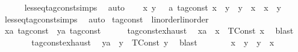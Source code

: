 \begin{isabellebody}
\ \ \ \ \isamarkupfalse%
\ less{\isacharunderscore}eq{\isacharunderscore}tag{\isacharunderscore}const{\isachardot}simps\ \isamarkupfalse%
\ auto\isanewline
{}\isamarkupfalse%
\isanewline
\ \ \isamarkupfalse%
\ {\isacartoucheopen}{\isasymAnd}x\ y\ \ {\isacharcolon}{\isacharcolon}\ {\isacharprime}a\ tag{\isacharunderscore}const{\isachardot}\ x\ {\isasymle}\ y\ {\isasymLongrightarrow}\ y\ {\isasymle}\ x\ {\isasymLongrightarrow}\ x\ {\isacharequal}\ y{\isacartoucheclose}\isanewline
\ \ \ \ \isamarkupfalse%
\ less{\isacharunderscore}eq{\isacharunderscore}tag{\isacharunderscore}const{\isachardot}simps\ \isamarkupfalse%
\ auto\isanewline
{}\isamarkupfalse%
%
\endisatagproof
{\isafoldproof}%
%
\isadelimproof
%
\endisadelimproof
\isanewline
\isanewline
{}\isamarkupfalse%
\isanewline
\isanewline
{}\isamarkupfalse%
\ tag{\isacharunderscore}const\ {\isacharcolon}{\isacharcolon}\ {\isacharparenleft}linorder{\isacharparenright}linorder\isanewline
{}\isanewline
{}\isamarkupfalse%
%
\isadelimproof
\ %
\endisadelimproof
%
\isatagproof
{}\isamarkupfalse%
\isanewline
\ \ \isacommand{{\isacharbraceleft}}\isamarkupfalse%
\ \isamarkupfalse%
\ x{\isacharcolon}{\isacharcolon}{\isacartoucheopen}{\isacharprime}a\ tag{\isacharunderscore}const{\isacartoucheclose}\ \ y{\isacharcolon}{\isacharcolon}{\isacartoucheopen}{\isacharprime}a\ tag{\isacharunderscore}const{\isacartoucheclose}\isanewline
\ \ \ \ \isamarkupfalse%
\ tag{\isacharunderscore}const{\isachardot}exhaust\ \isamarkupfalse%
\ xa\ \ {\isacartoucheopen}x\ {\isacharequal}\ TConst\ x\ \isamarkupfalse%
\ blast\isanewline
\ \ \ \ \isamarkupfalse%
\ \isamarkupfalse%
\ tag{\isacharunderscore}const{\isachardot}exhaust\ \isamarkupfalse%
\ ya\ \ {\isacartoucheopen}y\ {\isacharequal}\ TConst\ y\ \isamarkupfalse%
\ blast\isanewline
\ \ \ \ \isamarkupfalse%
\ \isamarkupfalse%
\ {\isacartoucheopen}x\ {\isasymle}\ y\ {\isasymor}\ y\ {\isasymle}\ x{\isacartoucheclose}\ \isamarkupfalse%

\end{isabellebody}
